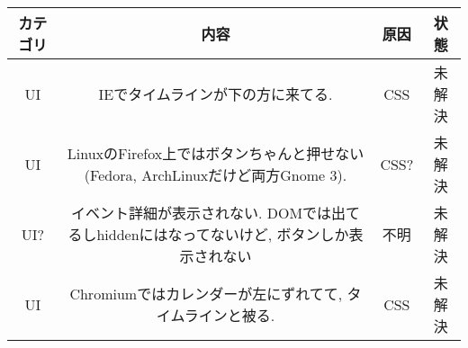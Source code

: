 \documentclass[a4paper,11pt,fleqn]{jsarticle}
\newcommand{\content}[1]{\begin{minipage}{8cm}\vspace{2mm}#1\vspace{2mm}\end{minipage}}
\begin{document}
\begin{table}[h]
  \begin{center}
    \begin{tabular}{|c|c|c|c|}
      \hline
      カテゴリ & 内容 & 原因 & 状態\\
      \hline
      UI & \content{IEでタイムラインが下の方に来てる.} & CSS & 未解決\\
      \hline
      UI & 
      \content{LinuxのFirefox上ではボタンちゃんと押せない(Fedora, ArchLinuxだけど両方Gnome 3).} & CSS? & 未解決\\
      \hline
      UI? &  \content{イベント詳細が表示されない. DOMでは出てるしhiddenにはなってないけど, ボタンしか表示されない} & 不明 & 未解決\\
      \hline
      UI & \content{Chromiumではカレンダーが左にずれてて, タイムラインと被る.} & CSS & 未解決\\
      \hline
    \end{tabular}
  \end{center}
\end{table}
\end{document}
